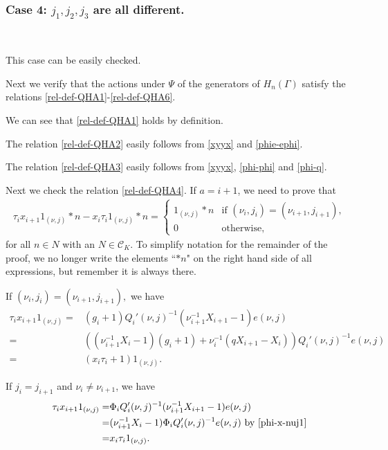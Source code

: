 \documentclass[11pt, reqno]{amsart} \textwidth=14.9cm \oddsidemargin=1cm \evensidemargin=1cm
\theoremstyle{definition}
\numberwithin{equation}{section}
\begin{document}
\subsubsection*{Case 4: $j_1, j_2, j_3$ are all different.}

\

\vspace{0.3cm}\noindent This case can be easily checked.

Next we verify that the actions under $\Psi$ of the generators of $H_{n}(\Gamma)$ satisfy the relations \eqref{rel-def-QHA1}-\eqref{rel-def-QHA6}.

We can see that \eqref{rel-def-QHA1} holds by definition.

The relation \eqref{rel-def-QHA2} easily follows from \eqref{xyyx} and \eqref{phie-ephi}.

The relation \eqref{rel-def-QHA3} easily follows from \eqref{xyyx}, \eqref{phi-phi} and \eqref{phi-q}.

Next we check the relation \eqref{rel-def-QHA4}. If $a=i+1$, we need to prove that
\begin{align*}
\tau_{i}x_{i+1}1_{(\nu, j)}\ast n-x_{i}\tau_{i}1_{(\nu, j)}\ast n=\left\{
\begin{array}{ll}
1_{(\nu, j)}\ast n&\text{if $(\nu_{i}, j_{i})=(\nu_{i+1}, j_{i+1})$},\\[0.3em]
0&\text{otherwise,}
\end{array}
\right.
\end{align*}
for all $n\in N$ with an $N\in \mathcal{C}_{K}.$ To simplify notation for the remainder of the proof, we no longer write the elements ``$\ast n$" on the right hand side of all expressions, but remember it is always there.

If $(\nu_{i}, j_{i})=(\nu_{i+1}, j_{i+1}),$ we have
\begin{align*}
\tau_{i}x_{i+1}1_{(\nu, j)}=&(g_{i}+1)Q_{i}'(\nu, j)^{-1}(\nu_{i+1}^{-1}X_{i+1}-1)e(\nu, j)\\
=&((\nu_{i+1}^{-1}X_{i}-1)(g_{i}+1)+\nu_{i}^{-1}(qX_{i+1}-X_{i}))Q_{i}'(\nu, j)^{-1}e(\nu, j)\\
=&(x_{i}\tau_{i}+1)1_{(\nu, j)}.
\end{align*}

If $j_{i}=j_{i+1}$ and $\nu_{i}\neq \nu_{i+1}$, we have
\begin{align*}
\tau_{i}x_{i+1}1_{(\nu, j)}=&\Phi_{i}Q_{i}'(\nu, j)^{-1}(\nu_{i+1}^{-1}X_{i+1}-1)e(\nu, j)\\
=&(\nu_{i+1}^{-1}X_{i}-1)\Phi_{i}Q_{i}'(\nu, j)^{-1}e(\nu, j)\text{ by }\eqref{phi-x-nuj1}\\
=&x_{i}\tau_{i}1_{(\nu, j)}.
\end{align*}
\end{document}

